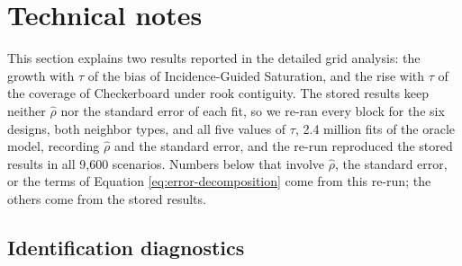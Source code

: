 \documentclass[11pt]{article}
\makeatletter
\newcommand{\applabel}[2]{\def\@currentlabel{#1}\label{#2}}
\makeatother
\begin{document}
\FloatBarrier

\section{Technical notes}\label{s6.-technical-notes}

\applabel{S9}{app:technical}

\applabel{S9}{app:technical-notes}This section explains two results
reported in the detailed grid analysis: the
growth with \(\tau\) of the bias of Incidence-Guided Saturation, and the rise with \(\tau\) of the coverage of Checkerboard
under rook contiguity. The stored results keep neither \(\hat\rho\) nor
the standard error of each fit, so we re-ran every block for the six
designs, both neighbor types, and all five values of \(\tau\), 2.4
million fits of the oracle model, recording \(\hat\rho\) and the
standard error, and the re-run reproduced the stored results in all
9,600 scenarios. Numbers below that involve \(\hat\rho\), the standard
error, or the terms of Equation \ref{eq:error-decomposition} come from
this re-run; the others come from the stored results.

\subsection{Identification
diagnostics}\label{identification-diagnostics}
\end{document}
